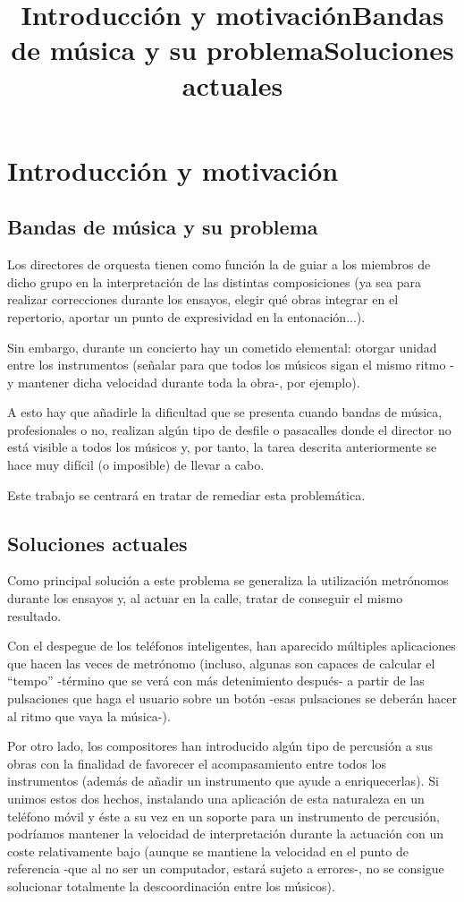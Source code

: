 \chapter{Introducción y motivación}
\title{Introducción y motivación}
\title{Bandas de música y su problema}
\section{Bandas de música y su problema}

Los directores de orquesta tienen como función la de guiar a los miembros de dicho grupo en la interpretación de las distintas composiciones (ya sea para realizar correcciones durante los ensayos, elegir qué obras integrar en el repertorio, aportar un punto de expresividad en la entonación...).

Sin embargo, durante un concierto hay un cometido elemental: otorgar unidad entre los instrumentos (señalar para que todos los músicos sigan el mismo ritmo -y mantener dicha velocidad durante toda la obra-, por ejemplo).

A esto hay que añadirle la dificultad que se presenta cuando bandas de música, profesionales o no, realizan algún tipo de desfile o pasacalles donde el director no está visible a todos los músicos y, por tanto, la tarea descrita anteriormente se hace muy difícil (o imposible) de llevar a cabo.

Este trabajo se centrará en tratar de remediar esta problemática.


\title{Soluciones actuales}
\section{Soluciones actuales}

Como principal solución a este problema se generaliza la utilización metrónomos durante los ensayos y, al actuar en la calle, tratar de conseguir el mismo resultado.

Con el despegue de los teléfonos inteligentes, han aparecido múltiples aplicaciones que hacen las veces de metrónomo (incluso, algunas son capaces de calcular el “tempo” -término que se verá con más detenimiento después- a partir de las pulsaciones que haga el usuario sobre un botón -esas pulsaciones se deberán hacer al ritmo que vaya la música-).

Por otro lado, los compositores han introducido algún tipo de percusión a sus obras con la finalidad de favorecer el acompasamiento entre todos los instrumentos (además de añadir un instrumento que ayude a enriquecerlas). Si unimos estos dos hechos, instalando una aplicación de esta naturaleza en un teléfono móvil y éste a su vez en un soporte para un instrumento de percusión, podríamos mantener la velocidad de interpretación durante la actuación con un coste relativamente bajo (aunque se mantiene la velocidad en el punto de referencia -que al no ser un computador, estará sujeto a errores-, no se consigue solucionar totalmente la descoordinación entre los músicos).


